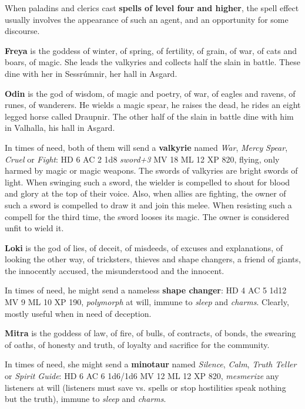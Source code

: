 \documentclass[11pt]{bxart}
\begin{document}
When paladins and clerics cast \textbf{spells of level four and higher}, the spell effect usually involves the appearance of such an agent, and an opportunity for some discourse.

\textbf{Freya} is the goddess of winter, of spring, of fertility, of grain, of war, of cats and boars, of magic. She leads the valkyries and collects half the slain in battle. These dine with her in Sessrúmnir, her hall in Asgard.

\textbf{Odin} is the god of wisdom, of magic and poetry, of war, of eagles and ravens, of runes, of wanderers. He wields a magic spear, he raises the dead, he rides an eight legged horse called Draupnir. The other half of the slain in battle dine with him in Valhalla, his hall in Asgard.

In times of need, both of them will send a \textbf{valkyrie} named \textit{War}, \textit{Mercy} \textit{Spear}, \textit{Cruel} or \textit{Fight}: HD 6 AC 2 1d8 \textit{sword+3} MV 18 ML 12 XP 820, flying, only harmed by magic or magic weapons. The swords of valkyries are bright swords of light. When swinging such a sword, the wielder is compelled to shout for blood and glory at the top of their voice. Also, when allies are fighting, the owner of such a sword is compelled to draw it and join this melee. When resisting such a compell for the third time, the sword looses its magic. The owner is considered unfit to wield it.

\textbf{Loki} is the god of lies, of deceit, of misdeeds, of excuses and explanations, of looking the other way, of tricksters, thieves and shape changers, a friend of giants, the innocently accused, the misunderstood and the innocent.

In times of need, he might send a nameless \textbf{shape changer}: HD 4 AC 5 1d12 MV 9 ML 10 XP 190, \textit{polymorph} at will, immune to \textit{sleep} and \textit{charms}. Clearly, mostly useful when in need of deception.

\textbf{Mitra} is the goddess of law, of fire, of bulls, of contracts, of bonds, the swearing of oaths, of honesty and truth, of loyalty and sacrifice for the community. 

In times of need, she might send a \textbf{minotaur} named \textit{Silence}, \textit{Calm}, \textit{Truth Teller} or \textit{Spirit Guide}: HD 6 AC 6 1d6/1d6 MV 12 ML 12 XP 820, \textit{mesmerize} any listeners at will (listeners must save vs. spells or stop hostilities speak nothing but the truth), immune to \textit{sleep} and \textit{charms}.
\end{document}
